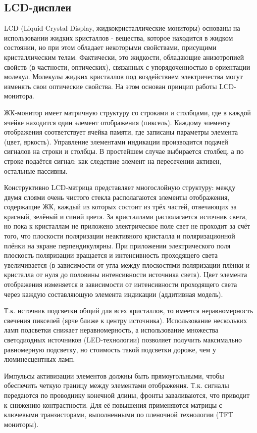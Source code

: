 \documentclass[unicode, 12pt, a4paper, oneside]{article}
\begin{document}
\subsection*{LCD-дисплеи}

LCD (Liquid Crystal Display, жидкокристаллические мониторы) основаны на использовании жидких кристаллов - вещества, которое находится в жидком состоянии, но при этом обладает некоторыми свойствами, присущими кристаллическим телам. Фактически, это жидкости, обладающие анизотропией свойств (в частности, оптических), связанных с упорядоченностью в ориентации молекул. Молекулы жидких кристаллов под воздействием электричества могут изменять свои оптические свойства. На этом основан принцип работы LCD-монитора.

ЖК-монитор имеет матричную структуру со строками и столбцами, где в каждой ячейке находится один элемент отображения (пиксель). Каждому элементу отображения соответствует ячейка памяти, где записаны параметры элемента (цвет, яркость). Управление элементами индикации производится подачей сигналов на строки и столбцы. В простейшем случае выбирается столбец, а по строке подаётся сигнал: как следствие элемент на пересечении активен, остальные пассивны.

Конструктивно LCD-матрица представляет многослойную структуру: между двумя слоями очень чистого стекла располагаются элементы отображения, содержащие ЖК, каждый из которых состоит из трёх частей, отвечающих за красный, зелёный и синий цвета. За кристаллами располагается источник света, но пока к кристаллам не приложено электрическое поле свет не проходит за счёт того, что плоскости поляризации неактивного кристалла и поляризационной плёнки на экране перпендикулярны. При приложении электрического поля плоскость поляризации вращается и интенсивность проходящего света увеличивается (в зависимости от угла между плоскостями поляризации плёнки и кристалла от нуля до половины интенсивности источника света). Цвет элемента отображения изменяется в зависимости от интенсивности проходящего света через каждую составляющую элемента индикации (аддитивная модель).

Т.к. источник подсветки общий для всех кристаллов, то имеется неравномерность свечения пикселей (ярче ближе к центру источника). Использование нескольких ламп подсветки снижает неравномерность, а использование множества светодиодных источников (LED-технологии) позволяет получить максимально равномерную подсветку, но стоимость такой подсветки дороже, чем у люминесцентных ламп.

Импульсы активизации элементов должны быть прямоугольными, чтобы обеспечить четкую границу между элементами отображения. Т.к. сигналы передаются по проводнику конечной длины, фронты заваливаются, что приводит к снижению контрастности. Для её повышения применяются матрицы с ключевыми транзисторами, выполненными по пленочной технологии (TFT мониторы).
\end{document}
